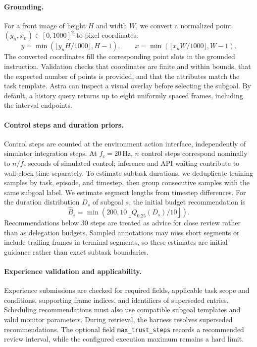 \paragraph{Grounding.}
For a front image of height $H$ and width $W$, we convert a normalized point $(y_n,x_n)\in[0,1000]^2$ to pixel coordinates:
\begin{equation}
 y=\min(\lfloor y_nH/1000\rfloor,H-1),\qquad
 x=\min(\lfloor x_nW/1000\rfloor,W-1).
\end{equation}
The converted coordinates fill the corresponding point slots in the grounded instruction. Validation checks that coordinates are finite and within bounds, that the expected number of points is provided, and that the attributes match the task template. Astra can inspect a visual overlay before selecting the subgoal. By default, a history query returns up to eight uniformly spaced frames, including the interval endpoints.

\paragraph{Control steps and duration priors.}
Control steps are counted at the environment action interface, independently of simulator integration steps. At $f_c=20\,\mathrm{Hz}$, $n$ control steps correspond nominally to $n/f_c$ seconds of simulated control; inference and API waiting contribute to wall-clock time separately. To estimate subtask durations, we deduplicate training samples by task, episode, and timestep, then group consecutive samples with the same subgoal label. We estimate segment lengths from timestep differences. For the duration distribution $D_s$ of subgoal $s$, the initial budget recommendation is
\begin{equation}
 \widehat B_s=\min\!\left(200,10\left\lfloor Q_{0.25}(D_s)/10\right\rfloor\right).
\end{equation}
Recommendations below 30 steps are treated as advice for close review rather than as delegation budgets. Sampled annotations may miss short segments or include trailing frames in terminal segments, so these estimates are initial guidance rather than exact subtask boundaries.

\paragraph{Experience validation and applicability.}
Experience submissions are checked for required fields, applicable task scope and conditions, supporting frame indices, and identifiers of superseded entries. Scheduling recommendations must also use compatible subgoal templates and valid monitor parameters. During retrieval, the harness resolves superseded recommendations. The optional field \texttt{max\_trust\_steps} records a recommended review interval, while the configured execution maximum remains a hard limit.


